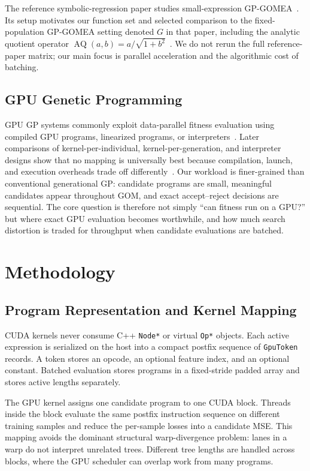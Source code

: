 \documentclass[conference]{IEEEtran}
\newcommand{\gpgomea}{GP-GOMEA\xspace}
\newcommand{\aq}{\operatorname{AQ}}
\begin{document}
The reference symbolic-regression paper studies small-expression
\gpgomea~\cite{virgolin2021improving}. Its setup motivates our function set and
selected comparison to the fixed-population GP-GOMEA setting denoted \(G\) in
that paper, including the analytic quotient operator
\(\aq(a,b)=a/\sqrt{1+b^2}\)~\cite{ni2013analytic}. We do not rerun the full
reference-paper matrix; our main focus is parallel acceleration and the
algorithmic cost of batching.

\subsection{GPU Genetic Programming}

GPU GP systems commonly exploit data-parallel fitness evaluation using compiled
GPU programs, linearized programs, or interpreters~\cite{harding2007fast,langdon2008simd,langdon2010many}.
Later comparisons of kernel-per-individual, kernel-per-generation, and
interpreter designs show that no mapping is universally best because compilation,
launch, and execution overheads trade off differently~\cite{kim2017gpgpgpu}. Our
workload is finer-grained than conventional generational GP: candidate programs
are small, meaningful candidates appear throughout GOM, and exact accept--reject
decisions are sequential. The core question is therefore not simply ``can
fitness run on a GPU?'' but where exact GPU evaluation becomes worthwhile, and
how much search distortion is traded for throughput when candidate evaluations
are batched.

\section{Methodology}

\subsection{Program Representation and Kernel Mapping}

CUDA kernels never consume C++ \texttt{Node*} or virtual \texttt{Op*} objects.
Each active expression is serialized on the host into a compact postfix sequence
of \texttt{GpuToken} records. A token stores an opcode, an optional feature
index, and an optional constant. Batched evaluation stores programs in a
fixed-stride padded array and stores active lengths separately.

The GPU kernel assigns one candidate program to one CUDA block. Threads inside
the block evaluate the same postfix instruction sequence on different training
samples and reduce the per-sample losses into a candidate MSE. This mapping
avoids the dominant structural warp-divergence problem: lanes in a warp do not
interpret unrelated trees. Different tree lengths are handled across blocks,
where the GPU scheduler can overlap work from many programs.
\end{document}
